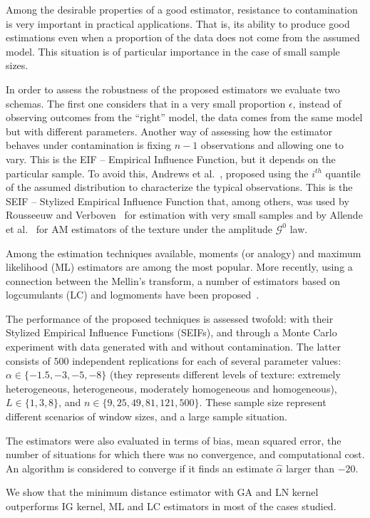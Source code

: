 \documentclass[a4paper]{article} %
\begin{document}
Among the desirable properties of a good estimator, resistance to contamination is very important in practical applications. That is, its ability to produce good estimations even when a proportion of the data does not come from the assumed model. This situation is of particular importance in the case of small sample sizes.

In order to assess the robustness of the proposed estimators we evaluate two schemas. The first one considers that in a very small proportion $\epsilon$, instead of observing outcomes
from the “right” model, the data comes from the same model but with different parameters.  
Another way of assessing how the estimator behaves under contamination is fixing $n-1$ observations and allowing one to vary. This is the EIF -- Empirical Influence Function, but it depends on the particular sample.
To avoid this, Andrews et al.~\cite{Andrews1972}, proposed using the $i^{th}$ quantile of the assumed distribution to characterize the typical observations.
This is the SEIF -- Stylized Empirical Influence Function that, among others, was used by Rousseeuw and Verboven~\cite{RousseeuwCSDA} for estimation with very small samples and by Allende et al.~\cite{AllendeFreryetal:JSCS:05} for AM estimators of the texture under the amplitude $\mathcal G^0$ law.

Among the estimation techniques available, moments (or analogy) and maximum likelihood (ML) estimators are among the most popular.  More recently, using a connection between the Mellin's transform, a number of estimators based on logcumulants (LC) and logmoments have been proposed~\cite{MellinAnalysisPolSAR,BujorTrouveValetNicolas2004,khan2014}.

The performance of the proposed techniques is assessed twofold: with their Stylized Empirical Influence Functions (SEIFs), and through a Monte Carlo experiment with data generated with and without contamination. The latter consists of $500$ independent replications for each of several parameter values: 
$\alpha\in\{-1.5, -3, -5, -8\}$ (they represents different levels of texture: extremely heterogeneous, heterogeneous, moderately homogeneous and homogeneous), 
$L\in\{1,3,8\}$, and 
$n\in\{9, 25,49, 81,121,500\}$. 
These sample size represent different scenarios of window sizes, and a large sample situation.


The estimators were also evaluated in terms of bias, mean squared error, the number of situations for which there was no convergence, and computational cost. 
An algorithm is considered to converge if it finds an estimate $\widehat{\alpha}$ larger than $-20$. 

We show that the minimum distance estimator with GA and LN kernel outperforms IG kernel, ML and LC estimators in most of the cases studied.







\end{document}
